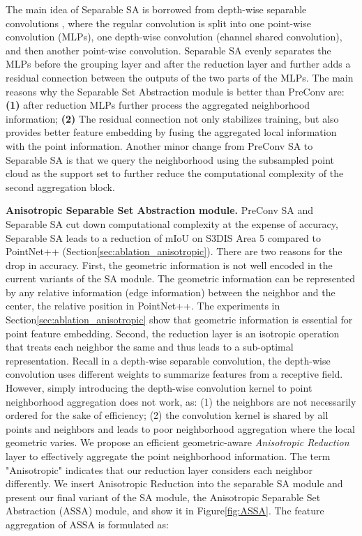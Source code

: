 \documentclass{article}
\newcommand{\figLabel}{Figure\xspace}
\newcommand{\secLabel}{Section\xspace}
\newcommand{\mysection}[1]{\vspace{3pt}\noindent\textbf{#1.}}
\begin{document}
The main idea of Separable SA is borrowed from depth-wise separable convolutions \cite{Howard2017MobileNetsEC}, where the regular convolution is split into one point-wise convolution (MLPs), one depth-wise convolution (channel shared convolution), and then another point-wise convolution. Separable SA evenly separates the MLPs before the grouping layer and after the reduction layer and further adds a residual connection between the outputs of the two parts of the MLPs. The main reasons why the Separable Set Abstraction module is better than PreConv are: \textbf{(1)} after reduction MLPs further process the aggregated neighborhood information; \textbf{(2)} The residual connection not only stabilizes training, but also provides better feature embedding by fusing the aggregated local information with the point information. Another minor change from PreConv SA to Separable SA is that we query the neighborhood using the subsampled point cloud  as the support set to further reduce the computational complexity of the second aggregation block. 

\mysection{Anisotropic Separable Set Abstraction module}
PreConv SA and Separable SA cut down computational complexity at the expense of accuracy, \eg Separable SA leads to a reduction of  mIoU on S3DIS Area 5 compared to PointNet++ (\secLabel \ref{sec:ablation_anisotropic}).
There are two reasons for the  drop in accuracy. First, the geometric information is not well encoded in the current variants of the SA module. The geometric information can be represented by any relative information (edge information) between the neighbor and the center, \eg the relative position  in PointNet++. The experiments in \secLabel \ref{sec:ablation_anisotropic} show that geometric information is essential for point feature embedding. 
Second, the reduction layer is an isotropic operation that treats each neighbor the same and thus leads to a sub-optimal representation. Recall in a depth-wise separable convolution, the depth-wise convolution uses different weights to summarize features from a  receptive field. However, simply introducing the depth-wise convolution kernel to point neighborhood aggregation does not work, as: (1) the neighbors are not necessarily ordered for the sake of efficiency; (2) the convolution kernel is shared by all points and neighbors and leads to poor neighborhood aggregation where the local geometric varies.
We propose an efficient geometric-aware \textit{Anisotropic Reduction} layer to effectively aggregate the point neighborhood information. The term "Anisotropic" indicates that our reduction layer considers each neighbor differently. We insert Anisotropic Reduction into the separable SA module and present our final variant of the SA module, the Anisotropic Separable Set Abstraction (ASSA) module, and show it in \figLabel \ref{fig:ASSA}. The feature aggregation of ASSA is formulated as:
\end{document}
